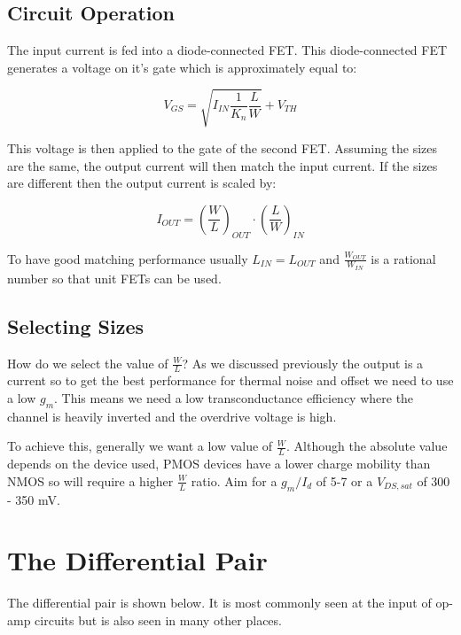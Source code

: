 \documentclass[11pt]{article}
\begin{document}
\subsection{Circuit Operation}

The input current is fed into a diode-connected FET. This diode-connected FET generates a voltage on it's gate which is approximately equal to:

\begin{equation}
V_{GS} = \sqrt{I_{IN} \frac{1}{K_n} \frac{L}{W}} + V_{TH}
\end{equation}

This voltage is then applied to the gate of the second FET. Assuming the sizes are the same, the output current will then match the input current. If the sizes are different then the output current is scaled by:

\begin{equation}
I_{OUT} = {\left(\frac{W}{L}\right)}_{OUT} \cdot {\left(\frac{L}{W}\right)}_{IN}
\end{equation}

To have good matching performance usually $L_{IN} = L_{OUT}$ and $\frac{W_{OUT}}{W_{IN}} $ is a rational number so that unit FETs can be used.

\subsection{Selecting Sizes}

How do we select the value of $\frac{W}{L}$? As we discussed previously the output is a current so to get the best performance for thermal noise and offset we need to use a low $g_m$. This means we need a low transconductance efficiency where the channel is heavily inverted and the overdrive voltage is high.

To achieve this, generally we want a low value of $\frac{W}{L}$. Although the absolute value depends on the device used, PMOS devices have a lower charge mobility than NMOS so will require a higher $\frac{W}{L}$ ratio. Aim for a $g_m/I_d$ of 5-7 or a $V_{DS,sat}$ of 300 - 350 mV.

\newpage
\section{The Differential Pair}

The differential pair is shown below. It is most commonly seen at the input of op-amp circuits but is also seen in many other places.
\end{document}
